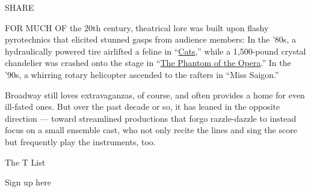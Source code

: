 SHARE

FOR MUCH OF the 20th century, theatrical lore was built upon flashy
pyrotechnics that elicited stunned gasps from audience members: In the
'80s, a hydraulically powered tire airlifted a feline in
``\href{https://www.nytimes.com/2016/07/24/theater/just-say-cats-and-watch-the-fur-fly.html}{Cats},''
while a 1,500-pound crystal chandelier was crashed onto the stage in
``\href{https://www.nytimes.com/2012/02/11/theater/phantom-of-the-opera-reaches-10000th-broadway-performance.html}{The
Phantom of the Opera}.'' In the '90s, a whirring rotary helicopter
ascended to the rafters in ``Miss Saigon.''

Broadway still loves extravaganzas, of course, and often provides a home
for even ill-fated ones. But over the past decade or so, it has leaned
in the opposite direction --- toward streamlined productions that forgo
razzle-dazzle to instead focus on a small ensemble cast, who not only
recite the lines and sing the score but frequently play the instruments,
too.

The T List \textbar{}

Sign up here

